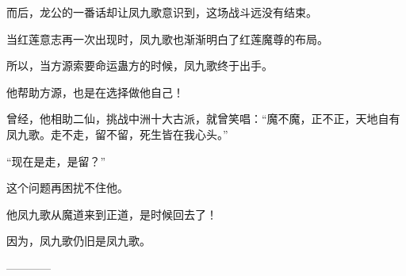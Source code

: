 \begin{this_body}
而后，龙公的一番话却让凤九歌意识到，这场战斗远没有结束。

当红莲意志再一次出现时，凤九歌也渐渐明白了红莲魔尊的布局。

所以，当方源索要命运蛊方的时候，凤九歌终于出手。

他帮助方源，也是在选择做他自己！

曾经，他相助二仙，挑战中洲十大古派，就曾笑唱：“魔不魔，正不正，天地自有凤九歌。走不走，留不留，死生皆在我心头。”

“现在是走，是留？”

这个问题再困扰不住他。

他凤九歌从魔道来到正道，是时候回去了！

因为，凤九歌仍旧是凤九歌。

------------

\end{this_body}

